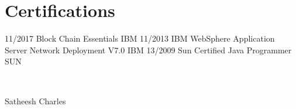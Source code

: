\documentclass[]{friggeri-cv}
\begin{document}
\section{Certifications}
\begin{entrylist}
  \entry
    {11/2017}
    {Block Chain Essentials}
    {IBM}
    {}
    \entry
    {11/2013}
    {IBM WebSphere Application Server Network Deployment V7.0}
    {IBM}
    {}
    \entry
    {13/2009}
    {Sun Certified Java Programmer}
    {SUN}
    {}
\end{entrylist}


    ~
    ~
    ~




\begin{flushright}
\footnotesize{Satheesh Charles}
\end{flushright}
\end{document}
